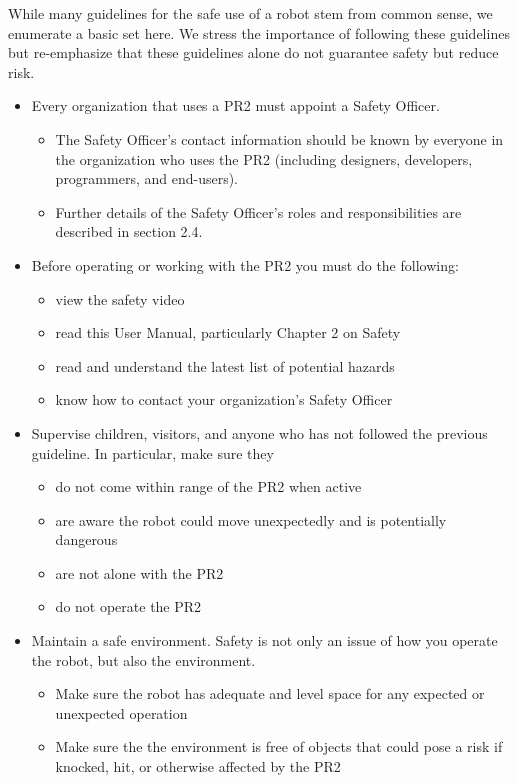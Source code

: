 While many guidelines for the safe use of a robot stem from common sense, we enumerate a basic set here.  We stress the importance of following these guidelines but re-emphasize that these guidelines alone do not guarantee safety but reduce risk.
\begin{itemize}
\item Every organization that uses a PR2 must appoint a Safety Officer. 
\begin{itemize}
\item The Safety Officer’s contact information should be known by everyone in the organization who uses the PR2 (including designers, developers, programmers, and end-users).
\item Further details of the Safety Officer’s roles and responsibilities are described in section 2.4.
\end{itemize}
\item Before operating or working with the PR2 you must do the following:
\begin{itemize}
\item view the safety video
\item read this User Manual, particularly Chapter 2 on Safety
\item read and understand the latest list of potential hazards
\item know how to contact your organization’s Safety Officer
\end{itemize}
\item Supervise children, visitors, and anyone who has not followed the previous guideline.  In particular, make sure they
\begin{itemize}
\item do not come within range of the PR2 when active
\item are aware the robot could move unexpectedly and is potentially dangerous
\item are not alone with the PR2
\item do not operate the PR2
\end{itemize}
\item Maintain a safe environment.  Safety is not only an issue of how you operate the robot, but also the environment.
\begin{itemize}
\item Make sure the robot has adequate and level space for any expected or unexpected operation
\item Make sure the the environment is free of objects that could pose a risk if knocked, hit, or otherwise affected by the PR2

\end{itemize}
\end{itemize}

